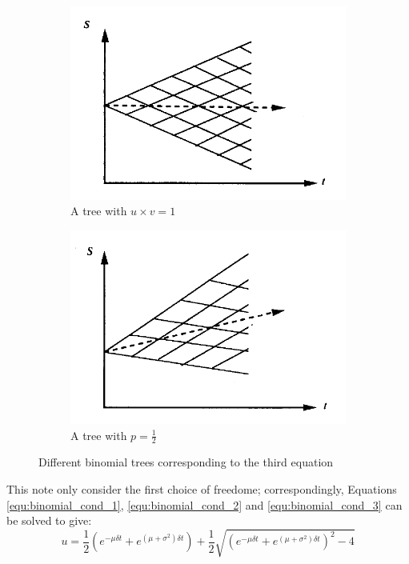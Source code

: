 \begin{figure}[H]
    \centering
    \begin{subfigure}[b]{0.45\textwidth}
        \includegraphics[width=\textwidth]{figure/uv=1.png}
        \caption{A tree with $u \times v = 1$}
    \end{subfigure}
    \begin{subfigure}[b]{0.45\textwidth}
        \includegraphics[width=\textwidth]{figure/p=05.png}
        \caption{A tree with $p = \frac{1}{2}$}
    \end{subfigure}
    \caption{Different binomial trees corresponding to the third equation}
    \label{fig:binomial_tree_3rd}
\end{figure}

This note only consider the first choice of freedome; correspondingly, Equations \ref{equ:binomial_cond_1}, \ref{equ:binomial_cond_2} and \ref{equ:binomial_cond_3} can be solved to give:
\begin{equation}
    u = \frac{1}{2} \left( e^{-\mu \delta t} + e^{\left( \mu + \sigma^2 \right)\delta t} \right) + \frac{1}{2} \sqrt{\left( e^{-\mu \delta t} + e^{\left( \mu + \sigma^2 \right)\delta t} \right)^2 - 4}
    \label{equ:binomial_u}
\end{equation}


